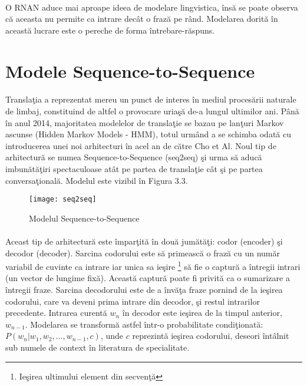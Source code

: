 \paragraph{}
O RNAN aduce mai aproape ideea de modelare lingvistica, \^ ins\u a se poate observa c\u a aceasta nu permite ca intrare dec\^ at o fraz\u a pe r\^ and. Modelarea dorit\u a \^ in aceast\u a lucrare este o pereche de forma \^ intrebare-r\u aspuns.

\section{Modele Sequence-to-Sequence}

\paragraph{}
Transla\c tia a reprezentat mereu un punct de interes \^ in mediul proces\u arii naturale de limbaj, constituind de altfel o provocare uria\c s\u a de-a lungul ultimilor ani. P\^ an\u a \^ in anul 2014, majoritatea modelelor de transla\c tie se bazau pe lan\c turi Markov ascunse (Hidden Markov Models - HMM), totul urm\^ and a se schimba odat\u a cu introducerea unei noi arhitecturi \^ in acel an de c\u atre Cho et Al. Noul tip de arhitectur\u a se numea Sequence-to-Sequence (seq2seq) \c si urma s\u a aduc\u a imbun\u at\u a\c tiri spectaculoase at\^ at pe partea de transla\c tie c\^ at \c si pe partea conversa\c tional\u a. Modelul este vizibil \^ in Figura 3.3.

\begin{figure}[H]
\centering
\texttt{[image: seq2seq]}
\caption{Modelul Sequence-to-Sequence}
\end{figure}

\paragraph{}
Aceast tip de arhitectur\u a este \^ impar\c tit\u a \^ in dou\u a jum\u at\u a\c ti: codor (encoder) \c si decodor (decoder). Sarcina codorului este s\u a primeasc\u a o fraz\u a cu un num\u ar variabil de cuvinte ca intrare iar unica sa ie\c sire \footnote{Ie\c sirea ultimului element din secven\c t\u a} s\u a fie o captur\u a a \^ intregii intrari (un vector de lungime fix\u a). Aceast\u a captur\u a poate fi privit\u a ca o sumarizare a \^ intregii fraze. Sarcina decodorului este de a \^ inv\u a\c ta fraze pornind de la ie\c sirea codorului, care va deveni prima intrare din decodor, \c si restul intrarilor precedente. Intrarea curent\u a \(w_{n}\) \^ in decodor este ie\c sirea de la timpul anterior, \(w_{n-1}\). Modelarea se transform\u a astfel \^ intr-o probabilitate condi\c tionat\u a: \(P(w_{n} | w_{1}, w_{2},..., w_{n-1}, c)\), unde \(c\) reprezint\u a ie\c sirea codorului, deseori \^ int\^ alnit sub numele de context \^ in literatura de specialitate.

